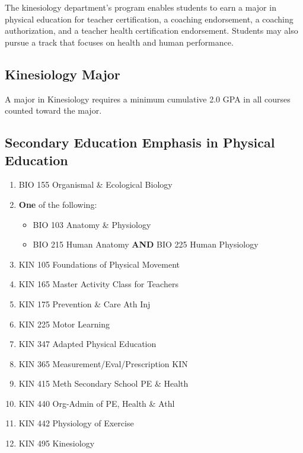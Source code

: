 \documentclass[
  letterpaper,
]{scrbook}
\providecommand{\tightlist}{%
  \setlength{\itemsep}{0pt}\setlength{\parskip}{0pt}}
\begin{document}
The kinesiology department's program enables students to earn a major in
physical education for teacher certification, a coaching endorsement, a
coaching authorization, and a teacher health certification endorsement.
Students may also pursue a track that focuses on health and human
performance.

\subsection{Kinesiology Major}\label{kinesiology-major}

A major in Kinesiology requires a minimum cumulative 2.0 GPA in all
courses counted toward the major.

\subsection{Secondary Education Emphasis in Physical
Education}\label{secondary-education-emphasis-in-physical-education}

\begin{enumerate}
\def\labelenumi{\arabic{enumi}.}
\tightlist
\item
  BIO 155 Organismal \& Ecological Biology
\item
  \textbf{One} of the following:

  \begin{itemize}
  \tightlist
  \item
    BIO 103 Anatomy \& Physiology
  \item
    BIO 215 Human Anatomy \textbf{AND} BIO 225 Human Physiology
  \end{itemize}
\item
  KIN 105 Foundations of Physical Movement
\item
  KIN 165 Master Activity Class for Teachers
\item
  KIN 175 Prevention \& Care Ath Inj
\item
  KIN 225 Motor Learning
\item
  KIN 347 Adapted Physical Education
\item
  KIN 365 Measurement/Eval/Prescription KIN
\item
  KIN 415 Meth Secondary School PE \& Health
\item
  KIN 440 Org-Admin of PE, Health \& Athl
\item
  KIN 442 Physiology of Exercise
\item
  KIN 495 Kinesiology
\end{enumerate}
\end{document}
